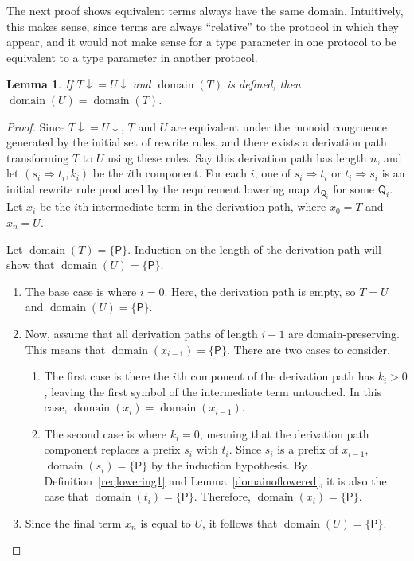 \documentclass[headsepline,bibliography=totoc]{scrreport}
\newcommand{\proto}[1]{\bm{\mathsf{#1}}}
\DeclareMathOperator{\domain}{domain}
\newtheorem{lemma}{Lemma}[chapter]
\theoremstyle{definition}
\theoremstyle{definition}
\theoremstyle{definition}
\begin{document}
The next proof shows equivalent terms always have the same domain. Intuitively, this makes sense, since terms are always ``relative'' to the protocol in which they appear, and it would not make sense for a type parameter in one protocol to be equivalent to a type parameter in another protocol.
\begin{lemma} If ${T}{\downarrow}={U}{\downarrow}$ and $\domain(T)$ is defined, then $\domain(U)=\domain(T)$.
\end{lemma}
\begin{proof}
Since ${T}{\downarrow}={U}{\downarrow}$, $T$ and $U$ are equivalent under the monoid congruence generated by the initial set of rewrite rules, and there exists a derivation path transforming $T$ to $U$ using these rules. Say this derivation path has length $n$, and let $(s_i\Rightarrow t_i, k_i)$ be the $i$th component. For each $i$, one of $s_i\Rightarrow t_i$ or $t_i\Rightarrow s_i$ is an initial rewrite rule produced by the requirement lowering map $\Lambda_{\proto{Q}_i}$ for some $\proto{Q}_i$. Let $x_i$ be the $i$th intermediate term in the derivation path, where $x_0=T$ and $x_n=U$.

Let $\domain(T)=\{\proto{P}\}$. Induction on the length of the derivation path will show that $\domain(U)=\{\proto{P}\}$.
\begin{enumerate}
\item The base case is where $i=0$. Here, the derivation path is empty, so $T=U$ and $\domain(U)=\{\proto{P}\}$.

\item Now, assume that all derivation paths of length $i-1$ are domain-preserving. This means that $\domain(x_{i-1})=\{\proto{P}\}$. There are two cases to consider.
\begin{enumerate}
\item The first case is there the $i$th component of the derivation path has $k_i>0$, leaving the first symbol of the intermediate term untouched. In this case, $\domain(x_i)=\domain(x_{i-1})$.
\item The second case is where $k_i=0$, meaning that the derivation path component replaces a prefix $s_i$ with $t_i$. Since $s_i$ is a prefix of $x_{i-1}$, $\domain(s_i)=\{\proto{P}\}$ by the induction hypothesis. By Definition~\ref{reqlowering1} and Lemma~\ref{domainoflowered}, it is also the case that $\domain(t_i)=\{\proto{P}\}$. Therefore, $\domain(x_i)=\{\proto{P}\}$.
\end{enumerate}
\item Since the final term $x_n$ is equal to $U$, it follows that $\domain(U)=\{\proto{P}\}$.
\end{enumerate}
\end{proof}
\end{document}

